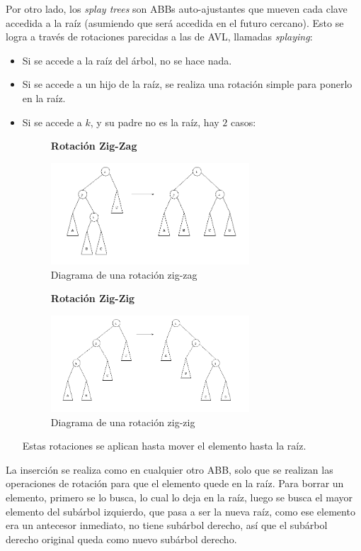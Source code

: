 \documentclass{article}
\begin{document}
Por otro lado, los \textit{splay trees} son ABBs auto-ajustantes que mueven cada clave accedida a la raíz (asumiendo que será accedida en el futuro cercano). Esto se logra a través de rotaciones parecidas a las de AVL, llamadas \textit{splaying}:
\begin{itemize}
    \item Si se accede a la raíz del árbol, no se hace nada.
    \item Si se accede a un hijo de la raíz, se realiza una rotación simple para ponerlo en la raíz.
    \item Si se accede a $k$, y su padre no es la raíz, hay $2$ casos:
        \begin{figure}[H]
            \centering
            \textbf{Rotación Zig-Zag}\par\medskip
            \includegraphics[width=0.7\textwidth]{rotacion_zig_zag.png}
            \caption*{Diagrama de una rotación zig-zag}
        \end{figure}
        \begin{figure}[H]
            \centering
            \textbf{Rotación Zig-Zig}\par\medskip
            \includegraphics[width=0.7\textwidth]{rotacion_zig_zig.png}
            \caption*{Diagrama de una rotación zig-zig}
        \end{figure}
        Estas rotaciones se aplican hasta mover el elemento hasta la raíz.
\end{itemize}

La inserción se realiza como en cualquier otro ABB, solo que se realizan las operaciones de rotación para que el elemento quede en la raíz. Para borrar un elemento, primero se lo busca, lo cual lo deja en la raíz, luego se busca el mayor elemento del subárbol izquierdo, que pasa a ser la nueva raíz, como ese elemento era un antecesor inmediato, no tiene subárbol derecho, así que el subárbol derecho original queda como nuevo subárbol derecho.
\end{document}
